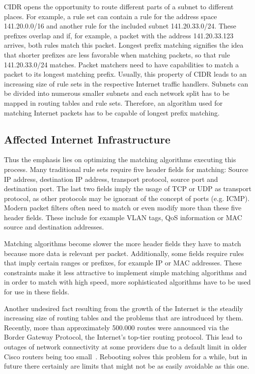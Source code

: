 \documentclass[a4paper,
		12pt,
		parskip=full,
		titlepage
		]{scrartcl}
\begin{document}
CIDR opens the opportunity to route different parts of a subnet to different places.
For example, a rule set can contain a rule for the address space 141.20.0.0/16 and another rule for the included subnet 141.20.33.0/24.
These prefixes overlap and if, for example, a packet with the address 141.20.33.123 arrives, both rules match this packet.
Longest prefix matching signifies the idea that shorter prefixes are less favorable when matching packets, so that rule 141.20.33.0/24 matches.
Packet matchers need to have capabilities to match a packet to its longest matching prefix.
Usually, this property of CIDR leads to an increasing size of rule sets in the respective Internet traffic handlers.
Subnets can be divided into numerous smaller subnets and each network split has to be mapped in routing tables and rule sets.
Therefore, an algorithm used for matching Internet packets has to be capable of longest prefix matching.

\subsection{Affected Internet Infrastructure}
Thus the emphasis lies on optimizing the matching algorithms executing this process.
Many traditional rule sets require five header fields for matching: Source 
IP address, destination IP address, transport protocol, source port and destination port.
The last two fields imply the usage of TCP or UDP as transport protocol, 
as other protocols may be ignorant of the concept of ports (e.g. ICMP).
Modern packet filters often need to match or even modify more than these five header fields.
These include for example VLAN tags, QoS information or MAC source and destination addresses.

Matching algorithms become slower the more header fields they have to match because more data is relevant per packet.
Additionally, some fields require rules that imply certain ranges or prefixes, for example IP or MAC addresses.
These constraints make it less attractive to implement simple matching algorithms and in order to match with high speed, more sophisticated
algorithms have to be used for use in these fields.

Another undesired fact resulting from the growth of the Internet is the 
steadily increasing size of routing tables and the problems that are introduced by them.
Recently, more than approximately 500.000 routes were announced via the Border Gateway Protocol, the Internet's top-tier routing protocol.
This lead to outages of network connectivity at some providers due to a default limit in older Cisco routers being too small~\cite{outage}.
Rebooting solves this problem for a while, but in future there certainly are limits that might not be as easily avoidable as this one.
\end{document}
